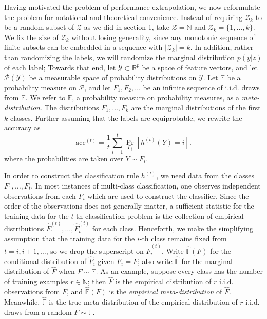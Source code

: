 \documentclass[12pt]{article}
\begin{document}
Having motivated the problem of performance extrapolation,
we now reformulate the problem for notational and theoretical convenience.
Instead of requiring $\mathcal{Z}_k$ to be a random subset of $\mathcal{Z}$ as we did in section 1, take
$\mathcal{Z}=\mathbb{N}$ and $\mathcal{Z}_k = \{1,\hdots, k\}$.
We fix the size of $\mathcal{Z}_k$ without losing generality, since any monotonic sequence of 
finite subsets can be embedded in a sequence with $|\mathcal{Z}_k| = k$.
In addition, rather than randomizing the labels, we will randomize the marginal distribution $p(y|z)$ of each label;
Towards that end, let $\mathcal{Y} \subset \mathbb{R}^p$ be a space of feature vectors, and
let $\mathcal{P}(\mathcal{Y})$ be a measurable space of probability distributions on $\mathcal{Y}$.
Let $\mathbb{F}$ be a probability measure on $\mathcal{P}$,
and let $F_1, F_2,\hdots$ be an infinite sequence of i.i.d. draws from $\mathbb{F}$.
We refer to $\mathbb{F}$, a probability measure on probability measures, as a \emph{meta-distribution}.
The distributions $F_1,\hdots, F_k$ are the marginal distributions of the first $k$ classes.
Further assuming that the labels are equiprobable, we rewrite the accuracy as
\[
\text{acc}^{(t)} = \frac{1}{t}\sum_{i=1}^t \Pr_{F_i}[h^{(t)}(Y) = i].
\]
where the probabilities are taken over $Y \sim F_i$.

In order to construct the classification rule $h^{(t)}$, we need data from the classes $F_1,\hdots, F_t$.
In most instances of multi-class classification, one observes independent observations from each $F_i$
which are used to construct the classifier.  Since the order of the observations
does not generally matter, a sufficient statistic for the training data for the $t$-th classification problem
is the collection of empirical distributions
$\hat{F}_1^{(t)},\hdots,\hat{F}_t^{(t)}$ for each class.
Henceforth, we make the simplifying assumption that the training data for the $i$-th class remains fixed
from $t =i, i+1,\hdots$, so we drop the superscript on $\hat{F}_i^{(t)}$.
Write $\hat{\mathbb{F}}(F)$ for the conditional distribution of $\hat{F}_i$ given  $F_i = F$;
also write $\hat{\mathbb{F}}$ for the marginal distribution of $\hat{F}$ when $F \sim \mathbb{F}.$
As an example, suppose every class has the number of training examples $r \in \mathbb{N}$; then $\hat{F}$
is the empirical distribution of $r$ i.i.d. observations from $F$, and $\hat{\mathbb{F}}(F)$ is the \emph{empirical meta-distribution} of $\hat{F}$.
Meanwhile, $\hat{\mathbb{F}}$ is the true meta-distribution of the empirical distribution of $r$ i.i.d. draws from a random $F \sim \mathbb{F}$.
\end{document}

